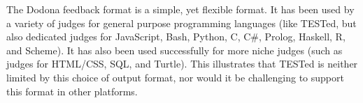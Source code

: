 \documentclass[../main]{subfiles}
\begin{document}
The Dodona feedback format is a simple, yet flexible format.
It has been used by a variety of judges for general purpose programming languages (like TESTed, but also dedicated judges for JavaScript, Bash, Python, C, C\#, Prolog, Haskell, R, and Scheme).
It has also been used successfully for more niche judges (such as judges for \textsc{HTML}/\textsc{CSS}, \textsc{SQL}, and Turtle).
This illustrates that TESTed is neither limited by this choice of output format, nor would it be challenging to support this format in other platforms.
\end{document}
